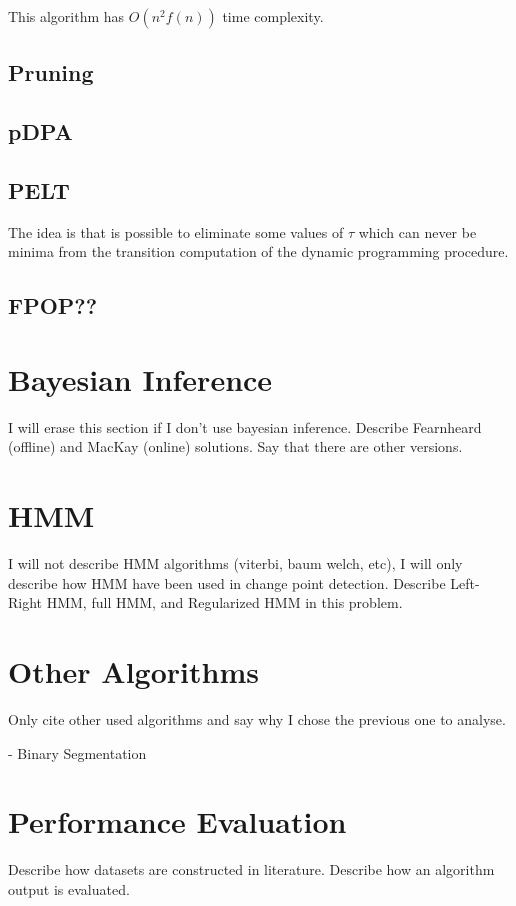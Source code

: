 This algorithm has $O(n^{2} f(n))$ time complexity.

\subsection{Pruning}

\subsection{pDPA}
\subsection{PELT}

The idea is that is possible to eliminate some values of $\tau$ which can never be minima from the transition computation of the dynamic programming procedure. 

\subsection{FPOP??}

\section{Bayesian Inference}
I will erase this section if I don't use bayesian inference. Describe Fearnheard (offline) and MacKay (online) solutions. Say that there are other versions.

\section{HMM}
I will not describe HMM algorithms (viterbi, baum welch, etc), I will only describe how HMM have been used in change point detection. Describe Left-Right HMM, full HMM, and Regularized HMM in this problem.

\section{Other Algorithms}
Only cite other used algorithms and say why I chose the previous one to analyse.

- Binary Segmentation

\section{Performance Evaluation}
  Describe how datasets are constructed in literature. Describe how an algorithm output is evaluated.

